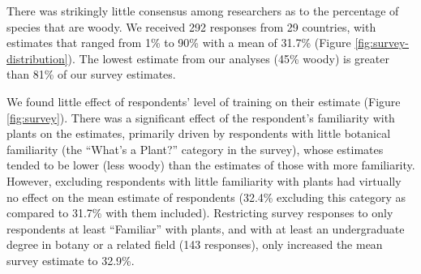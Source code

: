 There was strikingly little consensus among researchers as to the
percentage of species that are woody.  We received 292 responses from
29 countries, with estimates that ranged from 1\% to 90\% with a mean
of 31.7\% (Figure \ref{fig:survey-distribution}).  The lowest
estimate from our analyses (45\% woody) is greater than 81\% of our survey estimates.

We found little effect of respondents' level of training on their
estimate (Figure \ref{fig:survey}).  There was a significant effect of
the respondent's familiarity with plants on the estimates, primarily
driven by respondents with little botanical familiarity (the ``What's
a Plant?'' category in the survey), whose estimates tended to be lower (less woody)
than the estimates of those with more familiarity. However, excluding
respondents with little familiarity with plants had virtually no effect
on the mean estimate of respondents (32.4\% excluding this category as compared
to 31.7\% with them included).
Restricting survey responses to only respondents at least ``Familiar''
with plants, and with at least an undergraduate degree in botany or a
related field (143 responses), only increased the mean survey estimate
to 32.9\%.

